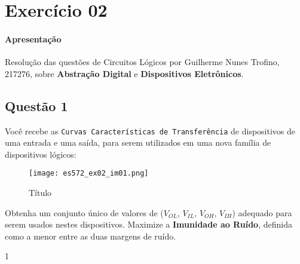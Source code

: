 \documentclass{article}
\begin{document}
    \section{Exercício 02}
        \paragraph{Apresentação}Resolução das questões de Circuitos Lógicos por Guilherme Nunes Trofino, 217276, sobre \textbf{Abstração Digital} e \textbf{Dispositivos Eletrônicos}.

        \subsection{Questão 1}
            \begin{exercise}
                Você recebe as \texttt{Curvas Características de Transferência} de dispositivos de uma entrada e uma saída, para serem utilizados em uma nova família de dispositivos lógicos:
                    \begin{figure}[H]
                        \centering
                        \texttt{[image: es572\_ex02\_im01.png]}
                        \caption{Título}
                    \end{figure} \noindent
                Obtenha um conjunto único de valores de ($V_{OL}$, $V_{IL}$, $V_{OH}$, $V_{IH}$) adequado para serem usados nestes dispositivos. Maximize a \textbf{Imunidade ao Ruído}, definida como a menor entre as duas margens de ruído.
            \end{exercise}
            \begin{resolution}
                1
            \end{resolution}

\newpage
\end{document}
